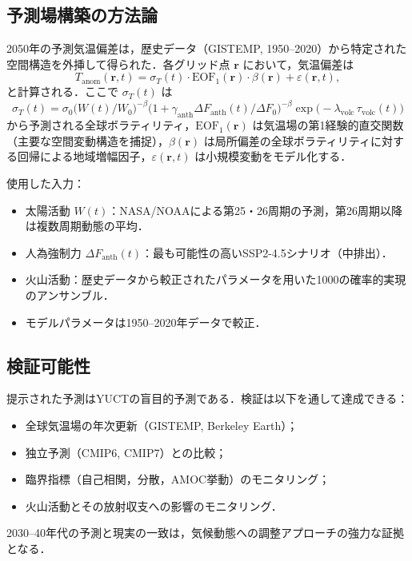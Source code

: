 \documentclass[11pt,a4paper]{article}
\begin{document}
	\subsection{予測場構築の方法論}
	
	2050年の予測気温偏差は，歴史データ（GISTEMP, 1950–2020）から特定された空間構造を外挿して得られた．各グリッド点 $\mathbf{r}$ において，気温偏差は
	\[
	T_{\mathrm{anom}}(\mathbf{r},t) = \sigma_T(t) \cdot \mathrm{EOF}_1(\mathbf{r}) \cdot \beta(\mathbf{r}) + \varepsilon(\mathbf{r},t),
	\]
	と計算される．ここで $\sigma_T(t)$ は
	\[
	\sigma_T(t) = \sigma_0 \bigl( W(t)/W_0 \bigr)^{-\beta} \bigl(1 + \gamma_{\mathrm{anth}} \Delta F_{\mathrm{anth}}(t)/\Delta F_0\bigr)^{-\beta} \exp\!\bigl(-\lambda_{\text{volc}} \,\tau_{\text{volc}}(t)\bigr)
	\]
	から予測される全球ボラティリティ，$\mathrm{EOF}_1(\mathbf{r})$ は気温場の第1経験的直交関数（主要な空間変動構造を捕捉），$\beta(\mathbf{r})$ は局所偏差の全球ボラティリティに対する回帰による地域増幅因子，$\varepsilon(\mathbf{r},t)$ は小規模変動をモデル化する．
	
	使用した入力：
	\begin{itemize}
		\item 太陽活動 $W(t)$：NASA/NOAAによる第25・26周期の予測，第26周期以降は複数周期動態の平均．
		\item 人為強制力 $\Delta F_{\mathrm{anth}}(t)$：最も可能性の高いSSP2-4.5シナリオ（中排出）．
		\item 火山活動：歴史データから較正されたパラメータを用いた1000の確率的実現のアンサンブル．
		\item モデルパラメータは1950–2020年データで較正．
	\end{itemize}
	
	\subsection{検証可能性}
	
	提示された予測はYUCTの盲目的予測である．検証は以下を通して達成できる：
	\begin{itemize}
		\item 全球気温場の年次更新（GISTEMP, Berkeley Earth）；
		\item 独立予測（CMIP6, CMIP7）との比較；
		\item 臨界指標（自己相関，分散，AMOC挙動）のモニタリング；
		\item 火山活動とその放射収支への影響のモニタリング．
	\end{itemize}
	2030–40年代の予測と現実の一致は，気候動態への調整アプローチの強力な証拠となる．
	
\end{document}
